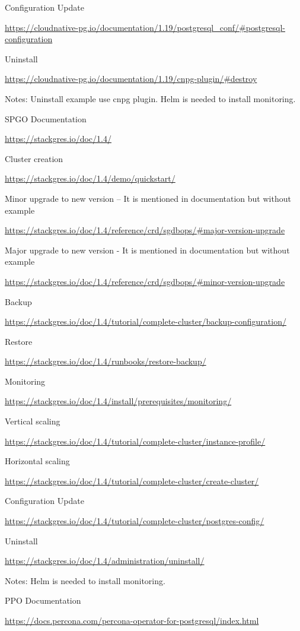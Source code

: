 Configuration Update

\url{https://cloudnative-pg.io/documentation/1.19/postgresql_conf/#postgresql-configuration}

Uninstall

\url{https://cloudnative-pg.io/documentation/1.19/cnpg-plugin/#destroy}

Notes: Uninstall example use cnpg plugin. Helm is needed to install monitoring.

SPGO
Documentation

\url{https://stackgres.io/doc/1.4/}

Cluster creation

\url{https://stackgres.io/doc/1.4/demo/quickstart/}

Minor upgrade to new version – It is mentioned in documentation but without example

\url{https://stackgres.io/doc/1.4/reference/crd/sgdbops/#major-version-upgrade}

Major upgrade to new version - It is mentioned in documentation but without example

\url{https://stackgres.io/doc/1.4/reference/crd/sgdbops/#minor-version-upgrade}

Backup

\url{https://stackgres.io/doc/1.4/tutorial/complete-cluster/backup-configuration/}

Restore

\url{https://stackgres.io/doc/1.4/runbooks/restore-backup/}

Monitoring

\url{https://stackgres.io/doc/1.4/install/prerequisites/monitoring/}

Vertical scaling

\url{https://stackgres.io/doc/1.4/tutorial/complete-cluster/instance-profile/}

Horizontal scaling

\url{https://stackgres.io/doc/1.4/tutorial/complete-cluster/create-cluster/}

Configuration Update

\url{https://stackgres.io/doc/1.4/tutorial/complete-cluster/postgres-config/}

Uninstall

\url{https://stackgres.io/doc/1.4/administration/uninstall/}

Notes: Helm is needed to install monitoring.

PPO
Documentation

\url{https://docs.percona.com/percona-operator-for-postgresql/index.html}

